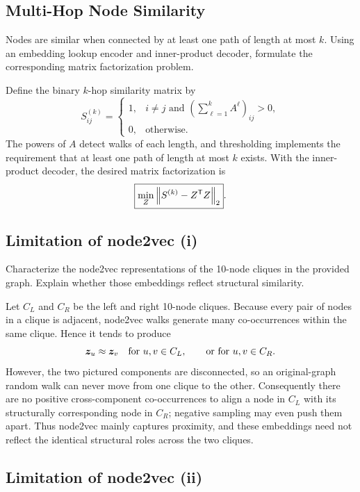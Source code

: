 \subsection{Multi-Hop Node Similarity}

Nodes are similar when connected by at least one path of length at most $k$.
Using an embedding lookup encoder and inner-product decoder, formulate the
corresponding matrix factorization problem.

\begin{solution}
Define the binary \(k\)-hop similarity matrix by
\[
  S^{(k)}_{ij}
  =
  \begin{cases}
    1, & i\ne j\text{ and }
      \left(\sum_{\ell=1}^{k}A^\ell\right)_{ij}>0,\\
    0, & \text{otherwise}.
  \end{cases}
\]
The powers of \(A\) detect walks of each length, and thresholding implements
the requirement that at least one path of length at most \(k\) exists.  With
the inner-product decoder, the desired matrix factorization is
\[
  \boxed{\min_Z\left\lVert S^{(k)}-Z^{\mathsf T}Z \right\rVert_2}.
\]
\end{solution}

\subsection{Limitation of node2vec (i)}

Characterize the node2vec representations of the 10-node cliques in the
provided graph. Explain whether those embeddings reflect structural similarity.

\begin{solution}
Let \(C_L\) and \(C_R\) be the left and right 10-node cliques.  Because every
pair of nodes in a clique is adjacent, node2vec walks generate many
co-occurrences within the same clique.  Hence it tends to produce
\[
  \bm{z}_u\approx\bm{z}_v
  \quad\text{for }u,v\in C_L,
  \qquad\text{or for }u,v\in C_R.
\]
However, the two pictured components are disconnected, so an original-graph
random walk can never move from one clique to the other.  Consequently there
are no positive cross-component co-occurrences to align a node in \(C_L\)
with its structurally corresponding node in \(C_R\); negative sampling may
even push them apart.  Thus node2vec mainly captures proximity, and these
embeddings need not reflect the identical structural roles across the two
cliques.
\end{solution}

\subsection{Limitation of node2vec (ii)}

